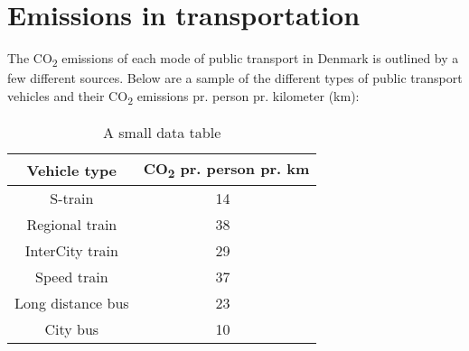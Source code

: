 \section{Emissions in transportation}\label{sec:emissions-in-transportation}

The \unit{CO_{2}} emissions of each mode of public transport in Denmark is outlined by a few different sources.
Below are a sample of the different types of public transport vehicles and their \unit{CO_{2}} emissions pr. person
pr. kilometer (km):

\begin{table}
    \centering
    \begin{tabular}{|c|c|}
        \hline
        Vehicle type & \unit{CO_{2}} pr. person pr. km \\
        \hline
        S-train & 14~\cite{dsb2023} \\
        Regional train & 38~\cite{dsb2023} \\
        InterCity train & 29~\cite{dsb2023} \\
        Speed train & 37~\cite{dsb2023} \\
        Long distance bus & 23~\cite{cowi2022} \\
        City bus & 10~\cite{ntm2023} \\
        \hline
    \end{tabular}
    \caption{A small data table}
    \label{tab:small_table}
\end{table}
